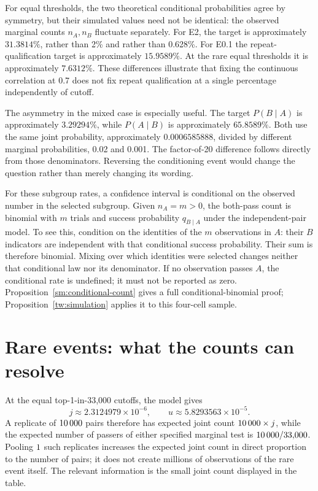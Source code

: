 For equal thresholds, the two theoretical conditional probabilities agree by
symmetry, but their simulated values need not be identical: the observed
marginal counts \(n_A,n_B\) fluctuate separately. For E2, the target is
approximately \(31.3814\%\), rather than 2\% and rather than 0.628\%.
For E0.1 the repeat-qualification target is approximately \(15.9589\%\).
At the rare equal thresholds it is approximately \(7.6312\%\). These
differences illustrate that fixing the continuous correlation at 0.7 does
not fix repeat qualification at a single percentage independently of cutoff.

The asymmetry in the mixed case is especially useful. The target
\(P(B\mid A)\) is approximately \(3.29294\%\), while
\(P(A\mid B)\) is approximately \(65.8589\%\). Both use the same joint
probability, approximately \(0.0006585888\), divided by different marginal
probabilities, 0.02 and 0.001. The factor-of-20 difference follows directly
from those denominators. Reversing the conditioning event would change the
question rather than merely changing its wording.

For these subgroup rates, a confidence interval is conditional on the observed
number in the selected subgroup. Given \(n_A=m>0\), the both-pass count is
binomial with \(m\) trials and success probability \(q_{B\mid A}\) under
the independent-pair model. To see this, condition on the identities of the
\(m\) observations in \(A\): their \(B\) indicators are independent with
that conditional success probability. Their sum is therefore binomial.
Mixing over which identities were selected changes neither that conditional
law nor its denominator. If no observation passes \(A\), the conditional
rate is undefined; it must not be reported as zero.
Proposition~\ref{sm:conditional-count} gives a full conditional-binomial proof;
Proposition~\ref{tw:simulation} applies it to this four-cell sample.

\chapter{Rare events: what the counts can resolve}
\label{sec:towers-rare}

At the equal top-1-in-33,000 cutoffs, the model gives
\[
 j\approx2.3124979\times10^{-6},\qquad
 u\approx5.8293563\times10^{-5}.
\]
A replicate of \(10\,000\) pairs therefore has expected joint count
\(10\,000\times j\), while the expected number of passers of either
specified marginal test is \(10\,000/33{,}000\).
Pooling \(1\) such replicates increases the expected
joint count in direct proportion to the number of pairs; it does not
create millions of observations of the rare event itself.
The relevant information is the small joint count displayed in the table.

